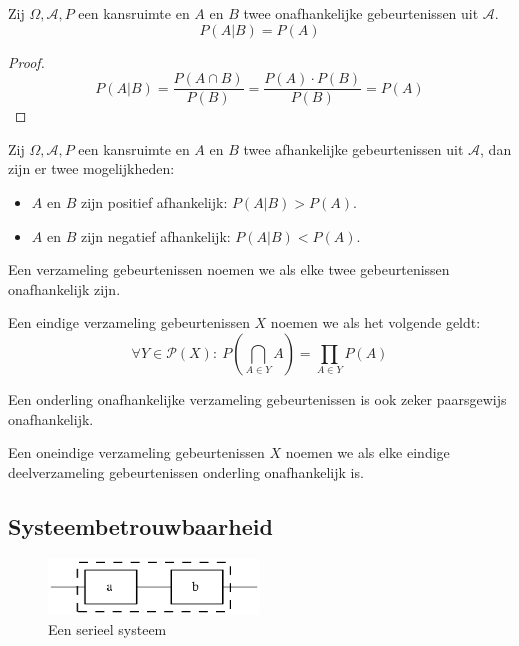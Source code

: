 \documentclass[main.tex]{subfiles}
\begin{document}
\begin{st}
  Zij $\Omega,\mathcal{A},P$ een kansruimte en $A$ en $B$ twee onafhankelijke gebeurtenissen uit $\mathcal{A}$.
  \[ P(A|B) = P(A) \]
  
  \begin{proof}
    \[ P(A|B) = \frac{P(A \cap B)}{P(B)} = \frac{P(A) \cdot P(B)}{P(B)} = P(A) \]
  \end{proof}
\end{st}

\begin{st}
  Zij $\Omega,\mathcal{A},P$ een kansruimte en $A$ en $B$ twee afhankelijke gebeurtenissen uit $\mathcal{A}$, dan zijn er twee mogelijkheden:
  \begin{itemize}
  \item $A$ en $B$ zijn positief afhankelijk: $P(A|B) > P(A)$.
  \item $A$ en $B$ zijn negatief afhankelijk: $P(A|B) < P(A)$.
  \end{itemize}
\end{st}

\begin{de}
  Een verzameling gebeurtenissen noemen we  als elke twee gebeurtenissen onafhankelijk zijn.
\end{de}

\begin{de}
  Een eindige verzameling gebeurtenissen $X$ noemen we  als het volgende geldt:
  \[ \forall Y\in \mathcal{P}(X):\ P\left( \bigcap_{A\in Y}A \right) = \prod_{A\in Y}P(A) \]
\end{de}

\begin{ei}
  Een onderling onafhankelijke verzameling gebeurtenissen is ook zeker paarsgewijs onafhankelijk.
\end{ei}

\begin{de}
  Een oneindige verzameling gebeurtenissen $X$ noemen we  als elke eindige deelverzameling gebeurtenissen onderling onafhankelijk is.
\end{de}

\subsection{Systeembetrouwbaarheid}
\label{sec:syst}

\begin{figure}[H]
  \caption{Een serieel systeem}
  \centering
    \includegraphics[width=0.5\textwidth]{assets/systeem-serieel.eps}
\end{figure}
\end{document}

